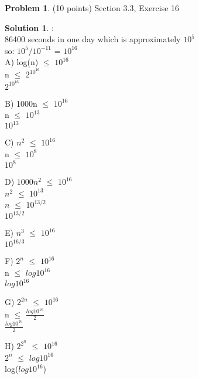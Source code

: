\documentclass{article}
\theoremstyle{definition}
\newtheorem{problem}{Problem}
\newtheorem*{solution}{Solution}
\begin{document}
\begin{problem} (10 points) Section 3.3, Exercise 16
\end{problem}
\begin{solution}:
\\
86400 seconds in one day which is approximately $10^5$
\\
so: $10^5 / 10^{-11}$ = $10^{16}$
\\
A) log(n) $\leq$ $10^{16}$
\\
n $\leq$ $2^{10^{16}}$
\\
$2^{10^{16}}$

\bigskip

B) 1000n $\leq$ $10^{16}$
\\
n  $\leq$ $10^{13}$
\\
$10^{13}$

\bigskip

C) $n^2$ $\leq$ $10^{16}$
\\
n $\leq$ $10^{8}$
\\
$10^{8}$
\bigskip

D) $1000n^2$ $\leq$ $10^{16}$
\\
$n^2$ $\leq$ $10^{13}$
\\
$n$ $\leq$ $10^{13/2}$
\\
$10^{13/2}$

\bigskip

E) $n^3$ $\leq$ $10^{16}$
\\
$10^{16/3}$

\bigskip

F) $2^n$ $\leq$ $10^{16}$
\\
n $\leq$ $log 10^{16}$
\\
$log 10^{16}$

\bigskip

G) $2^{2n}$ $\leq$ $10^{16}$
\\
n $\leq$ $\frac {log 10^{16}} {2}$
\\
 $\frac {log 10^{16}} {2}$
 \bigskip
 
 H) $2^{2^n}$ $\leq$ $10^{16}$
 \\
 $2^n$ $\leq$ $log 10^{16}$
 \\
 log($log 10^{16}$)
\end{solution}

\newpage
\end{document}
